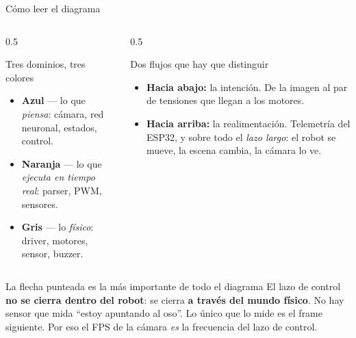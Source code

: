 \documentclass[aspectratio=169,10pt]{beamer}
\begin{document}
\begin{frame}{Cómo leer el diagrama}
  \begin{columns}[T,onlytextwidth]
    \begin{column}{0.5\textwidth}
      \begin{block}{Tres dominios, tres colores}
        \begin{itemize}\small
          \item \textcolor{azul}{\textbf{Azul}} --- lo que \emph{piensa}: cámara,
                red neuronal, estados, control.
          \item \textcolor{naranja}{\textbf{Naranja}} --- lo que \emph{ejecuta en
                tiempo real}: parser, PWM, sensores.
          \item \textcolor{gris}{\textbf{Gris}} --- lo \emph{físico}: driver,
                motores, sensor, buzzer.
        \end{itemize}
      \end{block}
    \end{column}
    \begin{column}{0.5\textwidth}
      \begin{block}{Dos flujos que hay que distinguir}
        \begin{itemize}\small
          \item \textbf{Hacia abajo:} la intención. De la imagen al par de
                tensiones que llegan a los motores.
          \item \textbf{Hacia arriba:} la realimentación. Telemetría del ESP32,
                y sobre todo el \emph{lazo largo}: el robot se mueve, la escena
                cambia, la cámara lo ve.
        \end{itemize}
      \end{block}
    \end{column}
  \end{columns}

  \vspace{0.6em}
  \begin{alertblock}{La flecha punteada es la más importante de todo el diagrama}
    \small
    El lazo de control \textbf{no se cierra dentro del robot}: se cierra
    \textbf{a través del mundo físico}. No hay sensor que mida ``estoy apuntando
    al oso''. Lo único que lo mide es el frame siguiente. Por eso el FPS de la
    cámara \emph{es} la frecuencia del lazo de control.
  \end{alertblock}
\end{frame}
\end{document}
